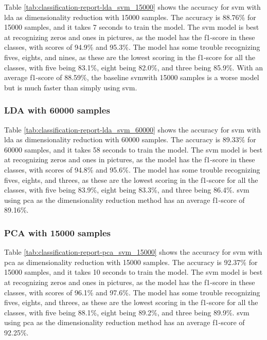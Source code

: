 Table \ref{tab:classification-report-lda_svm_15000} shows the accuracy for \gls{svm} with \gls{lda} as dimensionality reduction with 15000 samples. The accuracy is 88.76\% for 15000 samples, and it takes 7 seconds to train the model. The \gls{svm} model is best at recognizing zeros and ones in pictures, as the model has the f1-score in these classes, with scores of 94.9\% and 95.3\%. The model has some trouble recognizing fives, eights, and nines, as these are the lowest scoring in the f1-score for all the classes, with five being 83.1\%, eight being 82.0\%, and three being 85.9\%. With an average f1-score of 88.59\%, the baseline \gls{svm}with 15000 samples is a worse model but is much faster than simply using \gls{svm}.

\subsubsection{LDA with 60000 samples}\label{subsubsec:experiment-1-results-lda-60000}

Table \ref{tab:classification-report-lda_svm_60000} shows the accuracy for \gls{svm} with \gls{lda} as dimensionality reduction with 60000 samples. The accuracy is 89.33\% for 60000 samples, and it takes 58 seconds to train the model. The \gls{svm} model is best at recognizing zeros and ones in pictures, as the model has the f1-score in these classes, with scores of 94.8\% and 95.6\%. The model has some trouble recognizing fives, eights, and threes, as these are the lowest scoring in the f1-score for all the classes, with five being 83.9\%, eight being 83.3\%, and three being 86.4\%. \gls{svm} using \gls{pca} as the dimensionality reduction method has an average f1-score of 89.16\%.

\subsubsection{PCA with 15000 samples}\label{subsubsec:experiment-1-results-pca-15000}

Table \ref{tab:classification-report-pca_svm_15000} shows the accuracy for \gls{svm} with \gls{pca} as dimensionality reduction with 15000 samples. The accuracy is 92.37\% for 15000 samples, and it takes 10 seconds to train the model. The \gls{svm} model is best at recognizing zeros and ones in pictures, as the model has the f1-score in these classes, with scores of 96.1\% and 97.6\%. The model has some trouble recognizing fives, eights, and threes, as these are the lowest scoring in the f1-score for all the classes, with five being 88.1\%, eight being 89.2\%, and three being 89.9\%. \gls{svm} using \gls{pca} as the dimensionality reduction method has an average f1-score of 92.25\%.

